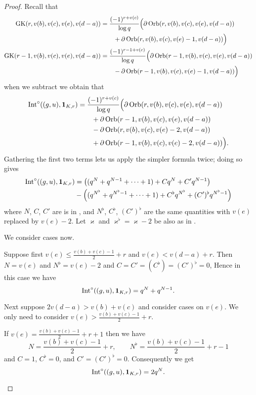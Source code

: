 \begin{proof}
  Recall that
  \begin{align*}
    \operatorname{GK}(r, v(b), v(c), v(e), v(d-a))
    &= \frac{(-1)^{r+v(c)}}{\log q} \Big(
      \partial \operatorname{Orb}(r, v(b), v(c), v(e), v(d-a)) \\
      &\qquad+ \partial \operatorname{Orb}(r, v(b), v(c), v(e)-1, v(d-a))
      \Big) \\
    \operatorname{GK}(r-1, v(b), v(c), v(e), v(d-a))
    &= \frac{(-1)^{r-1+v(c)}}{\log q} \Big(
      \partial \operatorname{Orb}(r-1, v(b), v(c), v(e), v(d-a)) \\
      &\qquad- \partial \operatorname{Orb}(r-1, v(b), v(c), v(e)-1, v(d-a))
      \Big)
  \end{align*}
  when we subtract we obtain that
  \begin{align*}
    \operatorname{Int}^\circ((g,u), \mathbf{1}_{K, r})
    &= \frac{(-1)^{r+v(c)}}{\log q} \Big(
      \partial \operatorname{Orb}(r, v(b), v(c), v(e), v(d-a)) \\
      &\qquad+ \partial \operatorname{Orb}(r-1, v(b), v(c), v(e), v(d-a)) \\
      &\qquad- \partial \operatorname{Orb}(r, v(b), v(c), v(e)-2, v(d-a)) \\
      &\qquad+ \partial \operatorname{Orb}(r-1, v(b), v(c), v(e)-2, v(d-a))
    \Big).
  \end{align*}
  Gathering the first two terms lets us apply the simpler formula  twice;
  doing so gives
  \begin{align*}
    \operatorname{Int}^\circ((g,u), \mathbf{1}_{K, r})
    &= \left( (q^N + q^{N-1} + \dots + 1) + C q^N + C' q^{N-1} \right) \\
    &- \left( (q^{N^\flat} + q^{N^\flat-1} + \dots + 1) + C^\flat q^{N^\flat} + (C')^\flat q^{N^\flat-1} \right)
  \end{align*}
  where $N$, $C$, $C'$ are is in ,
  and $N^\flat$, $C^\flat$, $(C')^\flat$ are the same quantities
  with $v(e)$ replaced by $v(e)-2$.
  Let $\varkappa$ and $\varkappa^\flat = \varkappa - 2$ be also as in .

  We consider cases now.
  \begin{itemize}
    \ii Suppose first $v(e) \le \frac{v(b)+v(c)-1}{2}+r$ and $v(e) < v(d-a)+r$.
    Then $N = v(e)$ and $N^\flat = v(e) - 2$ and $C = C' = (C^\flat) = (C')^\flat = 0$,
    Hence in this case we have
    \[ \operatorname{Int}^\circ((g,u), \mathbf{1}_{K, r}) = q^{N} + q^{N-1}. \]

    \ii Next suppose $2v(d-a) > v(b) + v(c)$ and consider cases on $v(e)$.
    We only need to consider $v(e) > \frac{v(b)+v(c)-1}{2} + r$.
    \begin{itemize}
      \ii If $v(e) = \frac{v(b)+v(c)-1}{2} + r + 1$
      then we have
      \[ N = \frac{v(b)+v(c)-1}{2} + r, \qquad N^\flat = \frac{v(b)+v(c)-1}{2} + r - 1 \]
      and
      $C = 1$, $C^\flat = 0$, and $C' = (C')^\flat = 0$.
      Consequently we get
      \[ \operatorname{Int}^\circ((g,u), \mathbf{1}_{K, r}) = 2 q^N. \]


\end{itemize}
\end{itemize}
\end{proof}
